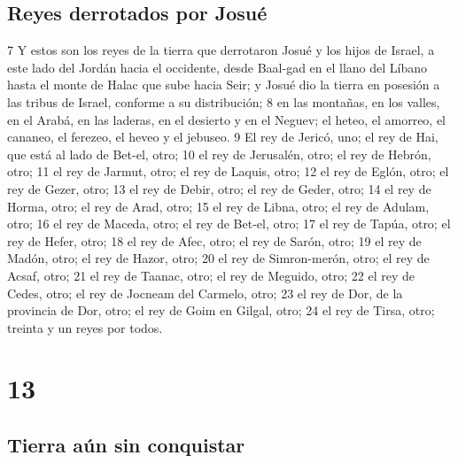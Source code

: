 \section*{Reyes derrotados por Josué}

7 Y estos son los reyes de la tierra que derrotaron Josué y los hijos de Israel, a este lado del Jordán hacia el occidente, desde Baal-gad en el llano del Líbano hasta el monte de Halac que sube hacia Seir; y Josué dio la tierra en posesión a las tribus de Israel, conforme a su distribución;
8 en las montañas, en los valles, en el Arabá, en las laderas, en el desierto y en el Neguev; el heteo, el amorreo, el cananeo, el ferezeo, el heveo y el jebuseo.
9 El rey de Jericó, uno; el rey de Hai, que está al lado de Bet-el, otro;
10 el rey de Jerusalén, otro; el rey de Hebrón, otro;
11 el rey de Jarmut, otro; el rey de Laquis, otro;
12 el rey de Eglón, otro; el rey de Gezer, otro;
13 el rey de Debir, otro; el rey de Geder, otro;
14 el rey de Horma, otro; el rey de Arad, otro;
15 el rey de Libna, otro; el rey de Adulam, otro;
16 el rey de Maceda, otro; el rey de Bet-el, otro;
17 el rey de Tapúa, otro; el rey de Hefer, otro;
18 el rey de Afec, otro; el rey de Sarón, otro;
19 el rey de Madón, otro; el rey de Hazor, otro;
20 el rey de Simron-merón, otro; el rey de Acsaf, otro;
21 el rey de Taanac, otro; el rey de Meguido, otro;
22 el rey de Cedes, otro; el rey de Jocneam del Carmelo, otro;
23 el rey de Dor, de la provincia de Dor, otro; el rey de Goim en Gilgal, otro;
24 el rey de Tirsa, otro; treinta y un reyes por todos.

\chapter{13}

\section*{Tierra aún sin conquistar}



